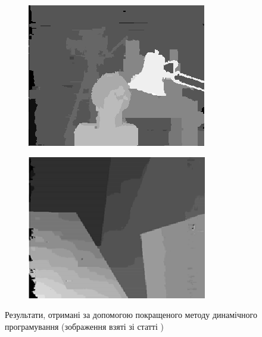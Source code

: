 \begin{figure}[h]
  \centering
  \begin{subfigure}[b]{0.45\textwidth}
      \includegraphics[width=\textwidth]{images/overview_wang_dynamic_tsukuba}
  \end{subfigure}
  \hfill
  \begin{subfigure}[b]{0.45\textwidth}
      \includegraphics[width=\textwidth]{images/overview_wang_dynamic_poster}
  \end{subfigure}
  \caption{Результати, отримані за допомогою покращеного методу динамічного
           програмування
           (зображення взяті зі статті \cite{overview:wang:dynamic})}
  \label{fig:overview:wang:dynamic}
\end{figure}


